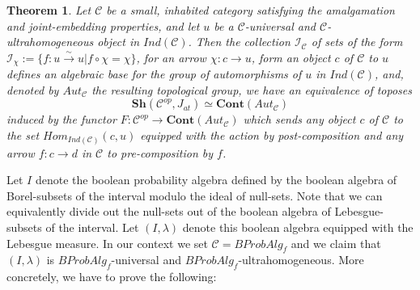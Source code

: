 \documentclass[a4paper,draft]{amsproc}
\theoremstyle{plain}
\newtheorem{theorem}{Theorem}[section]
\theoremstyle{definition}
\theoremstyle{remark}
\numberwithin{equation}{section}
\begin{document}
\begin{theorem}\label{olivia}
Let $\mathcal{C}$ be a small, inhabited category satisfying the amalgamation and joint-embedding properties, and let $u$ be a $\mathcal{C}$-universal and $\mathcal{C}$-ultrahomogeneous object in $Ind(\mathcal{C})$. Then the collection $\mathcal{I}_{\mathcal{C}}$ of sets of the form $\mathcal{I}_{\chi}:=\{f:u\overset{\sim}{\rightarrow} u| f\circ \chi=\chi\} $, for an arrow $\chi:c\rightarrow u$, form an object $c$ of $\mathcal{C}$ to $u$ defines an algebraic base for the group of automorphisms of $u$ in $Ind(\mathcal{C})$, and, denoted by $Aut_\mathcal{C}$ the resulting topological group, we have an equivalence of toposes
\[\textbf{Sh}(\mathcal{C}^{op},J_{at})\simeq \textbf{Cont}(Aut_\mathcal{C}) \]
induced by the functor $F:\mathcal{C}^{op}\rightarrow \textbf{Cont}(Aut_{\mathcal{C}})$ which sends any object $c$ of $\mathcal{C}$ to the set $Hom_{Ind(\mathcal{C})}(c,u)$ equipped with the action by post-composition and any arrow $f:c\rightarrow d$ in $\mathcal{C}$ to pre-composition by $f$.
\end{theorem}

Let $I$ denote the boolean probability algebra defined by the boolean algebra of Borel-subsets of the interval modulo the ideal of null-sets. Note that we can equivalently divide out the null-sets out of the boolean algebra of Lebesgue-subsets of the interval. Let $(I, \lambda)$ denote this boolean algebra equipped with the Lebesgue measure. In our context we set $\mathcal{C}=BProbAlg_f$ and we claim that $(I, \lambda)$ is  $BProbAlg_f$-universal and $BProbAlg_f$-ultrahomogeneous. More concretely, we have to prove the following:
\end{document}
